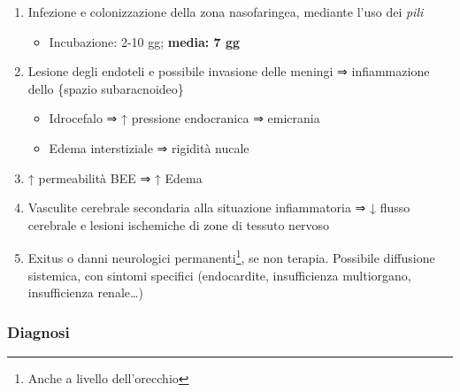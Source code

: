 \documentclass[italian,]{article}
\providecommand{\tightlist}{%
  \setlength{\itemsep}{0pt}\setlength{\parskip}{0pt}}
\begin{document}
\begin{enumerate}
\def\labelenumi{\arabic{enumi}.}
\setcounter{enumi}{-1}
\tightlist
\item
  Infezione e colonizzazione della zona nasofaringea, mediante l'uso dei
  \emph{pili}

  \begin{itemize}
  \tightlist
  \item
    Incubazione: 2-10 gg; \textbf{media: 7 gg}
  \end{itemize}
\item
  Lesione degli endoteli e possibile invasione delle meningi ⇒
  infiammazione dello \{spazio subaracnoideo\}

  \begin{itemize}
  \tightlist
  \item
    Idrocefalo ⇒ ↑ pressione endocranica ⇒ emicrania
  \item
    Edema interstiziale ⇒ rigidità nucale
  \end{itemize}
\item
  ↑ permeabilità BEE ⇒ ↑ Edema
\item
  Vasculite cerebrale secondaria alla situazione infiammatoria ⇒ ↓
  flusso cerebrale e lesioni ischemiche di zone di tessuto nervoso
\item
  Exitus o danni neurologici permanenti\footnote{Anche a livello
    dell'orecchio}, se non terapia. Possibile diffusione sistemica, con
  sintomi specifici (endocardite, insufficienza multiorgano,
  insufficienza renale\ldots{})
\end{enumerate}

\hypertarget{diagnosi-7}{%
\subsubsection{Diagnosi}\label{diagnosi-7}}
\end{document}
